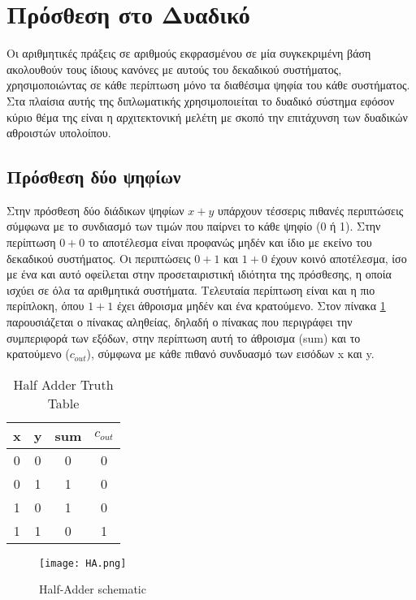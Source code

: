 

\section{Πρόσθεση στο Δυαδικό}
Οι αριθμητικές πράξεις σε αριθμούς εκφρασμένου σε μία συγκεκριμένη βάση ακολουθούν τους ίδιους κανόνες
με αυτούς του δεκαδικού συστήματος, χρησιμοποιώντας σε κάθε περίπτωση μόνο τα διαθέσιμα ψηφία του κάθε
συστήματος. Στα πλαίσια αυτής της διπλωματικής χρησιμοποιείται το δυαδικό σύστημα εφόσον κύριο θέμα 
της είναι η αρχιτεκτονική μελέτη με σκοπό την επιτάχυνση των δυαδικών αθροιστών υπολοίπου.





\subsection{Πρόσθεση δύο ψηφίων}
Στην πρόσθεση δύο διάδικων ψηφίων $x+y$ υπάρχουν τέσσερις πιθανές περιπτώσεις σύμφωνα με το συνδιασμό
των τιμών που παίρνει το κάθε ψηφίο (0 ή 1). Στην περίπτωση $0+0$ το αποτέλεσμα είναι προφανώς μηδέν 
και ίδιο με εκείνο του δεκαδικού συστήματος. Οι περιπτώσεις $0+1$ και $1+0$ έχουν κοινό αποτέλεσμα, 
ίσο με ένα και αυτό οφείλεται στην προσεταιριστική ιδιότητα της πρόσθεσης, η οποία ισχύει σε όλα
τα αριθμητικά συστήματα. Τελευταία περίπτωση είναι και η πιο περίπλοκη, όπου $1+1$ έχει άθροισμα μηδέν
και ένα κρατούμενο. Στον πίνακα \ref{tb:HA_truth_table} παρουσιάζεται ο πίνακας αληθείας, δηλαδή ο 
πίνακας που περιγράφει την συμπεριφορά των εξόδων, στην περίπτωση αυτή το άθροισμα (sum) και το 
κρατούμενο ($c_{out}$), σύμφωνα με κάθε πιθανό συνδυασμό των εισόδων x και y.


\begin{multicols}{2}
\begin{table}[H]
\centering
 \begin{tabular}{||c c | c c||} 
 \hline
 x & y & sum & $c_{out}$ \\ [0.5ex] 
 \hline\hline
 0 & 0 & 0 & 0 \\ 
 \hline
 0 & 1 & 1 & 0 \\
 \hline
 1 & 0 & 1 & 0 \\
 \hline
 1 & 1 & 0 & 1 \\
 \hline
\end{tabular}
\caption{Half Adder Truth Table}
 \label{tb:HA_truth_table}
\end{table}


\begin{figure}[H]
\centering
\texttt{[image: HA.png]}
\caption{Half-Adder schematic}
\label{HASchematic}
\end{figure}

\end{multicols}

